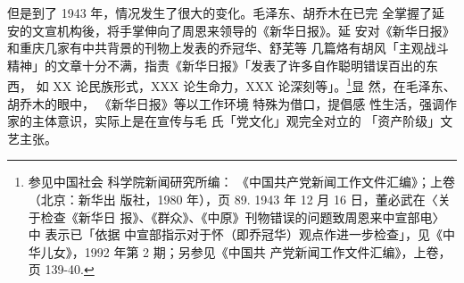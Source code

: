 但是到了 1943 年，情况发生了很大的变化。毛泽东、胡乔木在已完 全掌握了延
安的文宣机构後，将手掌伸向了周恩来领导的《新华日报》。延 安对《新华日报》
和重庆几家有中共背景的刊物上发表的乔冠华、舒芜等 几篇烙有胡风「主观战斗
精神」的文章十分不满，指责《新华日报》「发表了许多自作聪明错误百出的东西，
如 XX 论民族形式，XXX 论生命力，XXX 论深刻等」。\footnote{参见中国社会
科学院新闻研究所编： 《中国共产党新闻工作文件汇编》；上卷（北京：新华出
版社，1980 年），页 89. 1943 年 12 月 16 日，董必武在〈关于检查《新华日
报》、《群众》、《中原》刊物错误的问题致周恩来中宣部电〉中 表示已「依据
中宣部指示对于怀（即乔冠华）观点作进一步检查」，见《中华儿女》，1992
年第 2 期；另参见《中国共 产党新闻工作文件汇编》，上卷，页 139-40.  }显
然，在毛泽东、胡乔木的眼中， 《新华日报》等以工作环境 特殊为借口，提倡感
性生活，强调作家的主体意识，实际上是在宣传与毛 氏「党文化」观完全对立的
「资产阶级」文艺主张。

